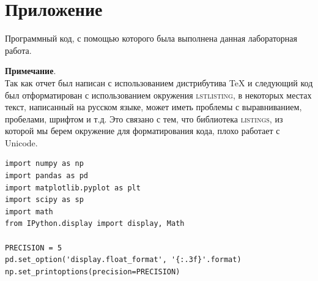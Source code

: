 \documentclass[a4paper, 14pt]{extarticle}
\begin{document}

\section{Приложение}

Программный код, с помощью которого была выполнена данная лабораторная работа.\\

\vspace{20pt}

\noindent \textbf{Примечание}.\\

\noindent Так как отчет был написан с использованием дистрибутива TeX и 
следующий код был отформатирован с использованием окружения \textsc{lstlisting}, 
в некоторых местах текст, написанный на русском языке, может иметь проблемы 
с выравниванием, пробелами, шрифтом и т.д. Это связано с тем, что библиотека 
\textsc{listings}, из которой мы берем окружение для форматирования кода, 
плохо работает с Unicode.

\vspace{20pt}




\lstset{style=mystyle, language=Python, extendedchars=\true}

\begin{lstlisting}[caption={Подключение библиотек}, label={lst:1}]
import numpy as np
import pandas as pd
import matplotlib.pyplot as plt
import scipy as sp
import math
from IPython.display import display, Math

PRECISION = 5
pd.set_option('display.float_format', '{:.3f}'.format)
np.set_printoptions(precision=PRECISION)
\end{lstlisting}
\end{document}
